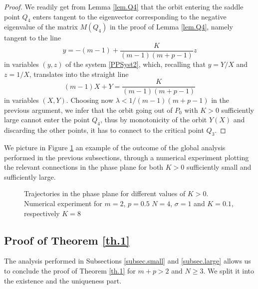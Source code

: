 \documentclass[a4paper,11pt]{article}
\numberwithin{equation}{section}
\begin{document}
\begin{proof}
We readily get from Lemma \ref{lem.Q4} that the orbit entering the saddle point $Q_4$ enters tangent to the eigenvector corresponding to the negative eigenvalue of the matrix $M(Q_4)$ in the proof of Lemma \ref{lem.Q4}, namely tangent to the line
$$
y=-(m-1)+\frac{K}{(m-1)(m+p-1)}z
$$
in variables $(y,z)$ of the system \eqref{PPSyst2}, which, recalling that $y=Y/X$ and $z=1/X$, translates into the straight line
$$
(m-1)X+Y=\frac{K}{(m-1)(m+p-1)}
$$
in variables $(X,Y)$. Choosing now $\lambda<1/(m-1)(m+p-1)$ in the previous argument, we infer that the orbit going out of $P_0$ with $K>0$ sufficiently large cannot enter the point $Q_4$, thus by monotonicity of the orbit $Y(X)$ and discarding the other points, it has to connect to the critical point $Q_3$.
\end{proof}
We picture in Figure \ref{fig3} an example of the outcome of the global analysis performed in the previous subsections, through a numerical experiment plotting the relevant connections in the phase plane for both $K>0$ sufficiently small and sufficiently large.

\begin{figure}[ht!]
  \begin{center}
  \end{center}
  \caption{Trajectories in the phase plane for different values of $K>0$. Numerical experiment for $m=2$, $p=0.5$ $N=4$, $\sigma=1$ and $K=0.1$, respectively $K=8$}\label{fig3}
\end{figure}

\subsection{Proof of Theorem \ref{th.1}}\label{subsec.proof}

The analysis performed in Subsections \ref{subsec.small} and \ref{subsec.large} allows us to conclude the proof of Theorem \ref{th.1} for $m+p>2$ and $N\geq3$. We split it into the existence and the uniqueness part.

\medskip
\end{document}

